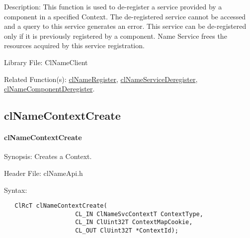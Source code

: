 \begin{flushleft}
\begin{Desc}
\item[Description:]This function is used to de-register a service provided by a component in a specified Context. The de-registered service cannot be accessed and a 
query to this service generates an error. This service can be de-registered only if it is previously registered by a component. Name Service frees the resources 
acquired by this service registration. 
\end{Desc}
\begin{Desc}
\item[Library File:]Cl\-Name\-Client\end{Desc}
\begin{Desc}
\item[Related Function(s):]\hyperlink{pagens103}{cl\-Name\-Register}, \hyperlink{pagens105}{cl\-Name\-Service\-Deregister}, 
\hyperlink{pagens104}{cl\-Name\-Component\-Deregister}. \end{Desc}
\newpage


\subsection{clNameContextCreate}
\hypertarget{pagens106}{}\paragraph{cl\-Name\-Context\-Create}\label{pagens106}
\begin{Desc}
\item[Synopsis:]Creates a Context.\end{Desc}
\begin{Desc}
\item[Header File:]clNameApi.h\end{Desc}
\begin{Desc}
\item[Syntax:]

\footnotesize\begin{verbatim}   ClRcT clNameContextCreate(
					CL_IN ClNameSvcContextT ContextType,
					CL_IN ClUint32T ContextMapCookie,
					CL_OUT ClUint32T *ContextId);


\end{verbatim}
\end{Desc}
\end{flushleft}
